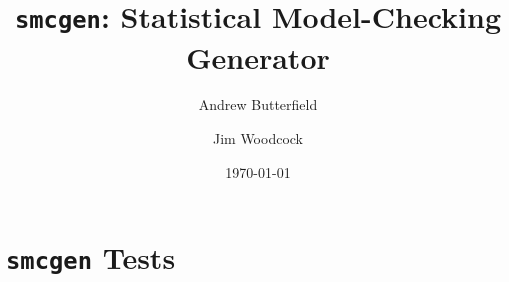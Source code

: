 \documentclass[fleqn,10pt]{report}
\author{
Andrew Butterfield \and Jim Woodcock
}
\title{
  \texttt{smcgen}:
  Statistical Model-Checking Generator
}
\date{
\today
}
\begin{document}
\maketitle
\tableofcontents
%

% 
%
%
% 
\newpage


% 
\chapter{\texttt{smcgen} Tests}
%

%
%
% 



\end{document}
